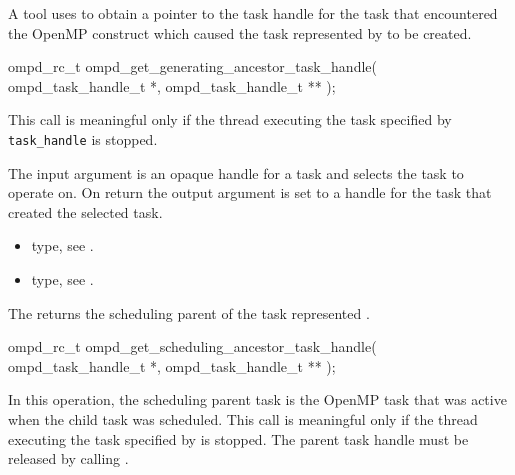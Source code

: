 \label{subsubsubsec:ompd_get_generating_ancestor_task_handle}
\summary
A tool uses  to obtain
a pointer to the task handle for the task that encountered the OpenMP construct which caused the
task represented by  to be created.

\format

\begin{cspecific}
\begin{ompSyntax}
ompd_rc_t ompd_get_generating_ancestor_task_handle(
  ompd_task_handle_t *,
  ompd_task_handle_t **
);
\end{ompSyntax}
\end{cspecific}


\descr
This call is meaningful only if the thread executing the task specified by
\verb|task_handle|  is stopped.

\argdesc
The input argument  is an opaque handle for a task and selects the task to operate on.
On return the output argument  is set to a handle for the task
that created the selected task.

\crossreferences
\begin{itemize}
  \item {} type, see .
	\item {} type, see .
\end{itemize}


\label{subsubsubsec:ompd_get_scheduling_ancestor_task_handle}
\summary
The  returns the
scheduling parent of the task represented .

\format

\begin{cspecific}
\begin{ompSyntax}
ompd_rc_t ompd_get_scheduling_ancestor_task_handle(
  ompd_task_handle_t *,
  ompd_task_handle_t **
);
\end{ompSyntax}
\end{cspecific}


\descr
In this operation, the scheduling parent task is the OpenMP task that was active when
the child task was scheduled. This call is meaningful only if the thread executing the task specified
by   is stopped. The parent task handle must be released by calling
.

